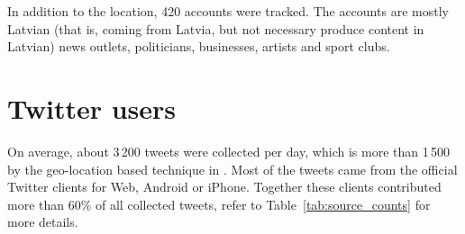 \documentclass{IOS-Book-Article}
\newcommand{\hl}[1]{#1}
\begin{document}
In addition to the location, 420 accounts were tracked.%
%
The accounts are mostly Latvian (that is, coming from Latvia, but not necessary produce content in Latvian) news outlets, politicians, businesses, artists and sport clubs. 




\section{Twitter users}
\label{sec:global-analysis}



On average, about \hl{3\,200} tweets were collected per day, which is more than 1\,500 by the geo-location based technique in \cite{milajevs:2017:BUCC}. Most of the tweets came from the official Twitter clients for Web, Android or iPhone. Together these clients contributed more than 60\% of all collected tweets, refer to Table~\ref{tab:source_counts} for more details.
\end{document}
